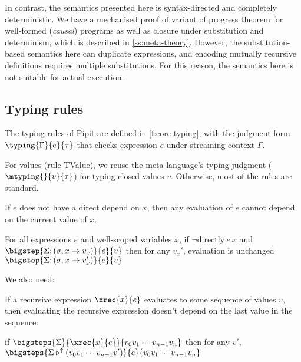 In contrast, the semantics presented here is syntax-directed and completely deterministic.
We have a mechanised proof of variant of progress theorem for well-formed (\emph{causal}) programs as well as closure under substitution and determinism, which is described in \autoref{ss:meta-theory}.
However, the substitution-based semantics here can duplicate expressions, and encoding mutually recursive definitions requires multiple substitutions.
For this reason, the semantics here is not suitable for actual execution.



\subsection{Typing rules}
\label{ss:typing-rules}

The typing rules of Pipit are defined in \autoref{f:core-typing}, with the judgment form $\typing{\Gamma}{e}{\tau}$ that checks expression $e$ under streaming context $\Gamma$.

For values (rule TValue), we reuse the \fstar{} meta-language's typing judgment ($\mtyping{}{v}{\tau}$) for typing closed values $v$.
Otherwise, most of the rules are standard.



\begin{lemma}
  If $e$ does not have a direct depend on $x$, then any evaluation of $e$ cannot depend on the current value of $x$.
    
  For all expressions $e$ and well-scoped variables $x$,
  if $\neg \mbox{directly} ~e~ x$ and
  $\bigstep{\Sigma; (\sigma, x \mapsto v_x)}{e}{v}$
  then for any $v_x'$, evaluation is unchanged
  $\bigstep{\Sigma; (\sigma, x \mapsto v_x')}{e}{v}$
  \end{lemma}
  
  We also need:
  \begin{lemma}
    If a recursive expression $\xrec{x}{e}$ evaluates to some sequence of values $v$, then evaluating the recursive expression doesn't depend on the last value in the sequence:
  
    if $\bigsteps{\Sigma}{\xrec{x}{e}}{v_0 v_1 \cdots v_{n-1} v_n }$
    then for any $v'$,
    $\bigsteps{\Sigma \triangleright^{\uparrow} (v_0 v_1 \cdots v_{n-1} v')}{e}{v_0 v_1 \cdots v_{n-1} v_n}$
  \end{lemma}
  
